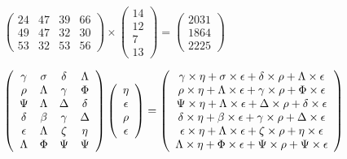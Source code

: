 \documentclass[12pt]{article}
\begin{document}
 
 
\noindent{}
 
 

 
$\left( \begin{array}{ccccccccccccccc}
          24  & 
          47  & 
          39  & 
          66  \\ 
          49  & 
          47  & 
          32  & 
          30  \\ 
          53  & 
          32  & 
          53  & 
          56
\end{array}\right) \times
\left( \begin{array}{c}
          14  \\ 
          12  \\ 
           7  \\ 
          13
\end{array}\right)  =
\left( \begin{array}{c}
        2031  \\ 
        1864  \\ 
        2225
\end{array}\right)  $
 
$  %
 \left( \begin{array}
 {
 c
 c
 c
 c
 }
 \gamma & 
 \sigma & 
 \delta & 
 \Lambda \\ 
 \rho & 
 \Lambda & 
 \gamma & 
 \Phi \\ 
 \Psi & 
 \Lambda & 
 \Delta & 
 \delta \\ 
 \delta & 
 \beta & 
 \gamma & 
 \Delta \\ 
 \epsilon & 
 \Lambda & 
                    \zeta & 
 \eta \\ 
 \Lambda & 
 \Phi & 
 \Psi & 
 \Psi
 \end{array} \right)
 \left( \begin{array}
 {
 c
 }
 \eta \\ 
 \epsilon \\ 
 \rho \\ 
 \epsilon
 \end{array} \right)
=
 \left( \begin{array}
 {
 c
 }
  \gamma \times  \eta +  \sigma \times  \epsilon +  \delta \times  \rho +  \Lambda \times  \epsilon \\ 
  \rho \times  \eta +  \Lambda \times  \epsilon +  \gamma \times  \rho +  \Phi \times  \epsilon \\ 
  \Psi \times  \eta +  \Lambda \times  \epsilon +  \Delta \times  \rho +  \delta \times  \epsilon \\ 
  \delta \times  \eta +  \beta \times  \epsilon +  \gamma \times  \rho +  \Delta \times  \epsilon \\ 
  \epsilon \times  \eta +  \Lambda \times  \epsilon +                     \zeta \times  \rho +  \eta \times  \epsilon \\ 
  \Lambda \times  \eta +  \Phi \times  \epsilon +  \Psi \times  \rho +  \Psi \times  \epsilon
 \end{array} \right)
$
 
\end{document}

